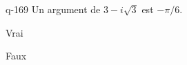 \begin{truefalse}{q-169}
Un argument de $3-i\sqrt{3}$ est $-\pi/6$.
\item* Vrai
\item Faux
\end{truefalse}

